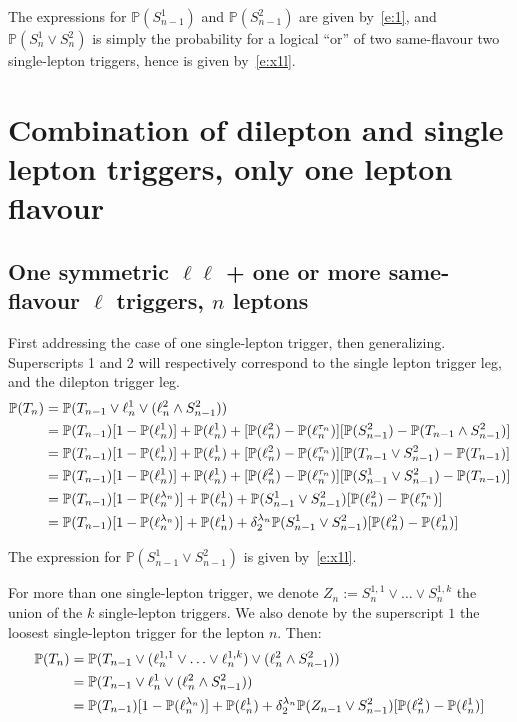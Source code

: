 \documentclass{article}
\newcommand{\pro}{\ensuremath{\mathbb{P}}}
\begin{document}
The expressions for $\pro(S_{n-1}^1)$ and $\pro(S_{n-1}^2)$ are given by~\ref{e:1}, 
and $\pro(S_{n}^1\vee S_{n}^2)$ is simply the probability 
for a logical ``or'' of two same-flavour two single-lepton triggers, hence is given by~\ref{e:x1l}. 

\section{Combination of dilepton and single lepton triggers, only one lepton flavour}

\subsection{One symmetric $\ell\ell$ + one or more same-flavour $\ell$ triggers, $n$ leptons}

First addressing the case of one single-lepton trigger, then generalizing. 
Superscripts 1 and 2 will respectively correspond to the single lepton trigger leg, and the dilepton trigger leg. 
\begin{align}
\pro(T_n) &= \pro(T_{n-1} \vee \ell_n^1 \vee (\ell_n^2 \wedge S_{n-1}^2))\notag\\
&= \pro(T_{n-1})[1-\pro(\ell_n^1)] + \pro(\ell_n^1)
+ [\pro(\ell_n^2)-\pro(\ell_n^{\tau_n})][\pro(S_{n-1}^2) - \pro(T_{n-1}\wedge S_{n-1}^2)] \notag\\
&= \pro(T_{n-1})[1-\pro(\ell_n^1)] + \pro(\ell_n^1)
+ [\pro(\ell_n^2)-\pro(\ell_n^{\tau_n})][\pro(T_{n-1}\vee S_{n-1}^2) - \pro(T_{n-1})]\notag\\
&= \pro(T_{n-1})[1-\pro(\ell_n^1)] + \pro(\ell_n^1)
+ [\pro(\ell_n^2)-\pro(\ell_n^{\tau_n})][\pro(S_{n-1}^1\vee S_{n-1}^2) - \pro(T_{n-1})]\notag\\
&= \pro(T_{n-1})[1-\pro(\ell_n^{\lambda_n})] + \pro(\ell_n^1)
+ \pro(S_{n-1}^1\vee S_{n-1}^2)[\pro(\ell_n^2)-\pro(\ell_n^{\tau_n})]\notag\\
&= \pro(T_{n-1})[1-\pro(\ell_n^{\lambda_n})] + \pro(\ell_n^1)
+ \delta_2^{\lambda_n}\pro(S_{n-1}^1\vee S_{n-1}^2)[\pro(\ell_n^2)-\pro(\ell_n^1)]\notag
\end{align}

The expression for $\pro(S_{n-1}^1\vee S_{n-1}^2)$ is given by~\ref{e:x1l}. 

For more than one single-lepton trigger, we denote $Z_n:=S_n^{1,1}\vee\ldots\vee S_n^{1,k}$ the union of the 
$k$ single-lepton triggers. We also denote by the superscript $1$ the loosest single-lepton trigger for the lepton $n$.  
Then: 
\begin{align}
\pro(T_n) 
&= \pro(T_{n-1} \vee (\ell_n^{1,1}\vee\ldots\vee\ell_n^{1,k}) \vee (\ell_n^2 \wedge S_{n-1}^2))\notag\\
&= \pro(T_{n-1} \vee \ell_n^{1} \vee (\ell_n^2 \wedge S_{n-1}^2))\notag\\
&= \pro(T_{n-1})[1-\pro(\ell_n^{\lambda_n})] + \pro(\ell_n^{1})
+ \delta_2^{\lambda_n}
\pro(Z_{n-1}\vee S_{n-1}^2)[\pro(\ell_n^2)-\pro(\ell_n^{1})]
\label{e:2sO1}
\end{align}
\end{document}
